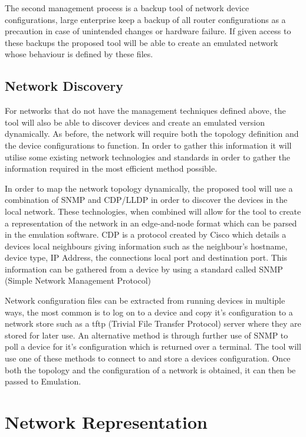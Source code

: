 \documentclass[11pt]{report}
\begin{document}
The second management process is a backup tool of network device configurations, large enterprise keep a backup of all router configurations as a precaution in case of unintended changes or hardware failure. If given access to these backups the proposed tool will be able to create an emulated network whose behaviour is defined by these files.

\subsection{Network Discovery}

For networks that do not have the management techniques defined above, the tool will also be able to discover devices and create an emulated version dynamically. As before, the network will require both the topology definition and the device configurations to function. In order to gather this information it will utilise some existing network technologies and standards in order to gather the information required in the most efficient method possible.

In order to map the network topology dynamically, the proposed tool will use a combination of SNMP and CDP/LLDP in order to discover the devices in the local network. These technologies, when combined will allow for the tool to create a representation of the network in an edge-and-node format which can be parsed in the emulation software. CDP is a protocol created by Cisco which details a devices local neighbours giving information such as the neighbour's hostname, device type, IP Address, the connections local port and destination port. This information can be gathered from a device by using a standard called SNMP (Simple Network Management Protocol)

Network configuration files can be extracted from running devices in multiple ways, the most common is to log on to a device and copy it's configuration to a network store such as a tftp (Trivial File Transfer Protocol) server where they are stored for later use. An alternative method is through further use of SNMP to poll a device for it's configuration which is returned over a terminal. The tool will use one of these methods to connect to and store a devices configuration. Once both the topology and the configuration of a network is obtained, it can then be passed to Emulation.

\section{Network Representation}
\end{document}
